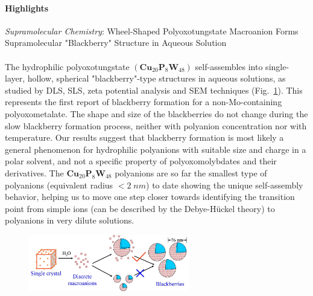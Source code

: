 \paragraph{Highlights}


{\sl Supramolecular Chemistry}: Wheel-Shaped Poly\-oxo\-tungstate
 Macro\-anion
Forms Supramolecular "Blackberry" Structure in Aqueous Solution\\
\\
The hydrophilic polyoxotungstate
$(\mathbf{Cu}_{20}\mathbf{P}_8\mathbf{W}_{48})$ self-assembles into single-layer, hollow,
spherical "blackberry"-type structures in aqueous solutions, as studied by DLS, SLS, zeta
potential analysis and SEM techniques (Fig.~\ref{kortzfig1}). This represents the first
report of blackberry formation for a non-Mo-containing polyoxometalate. The shape and size
of the blackberries do not change during the slow blackberry formation process, neither
with polyanion concentration nor with temperature. Our results suggest that blackberry
formation is most likely a general phenomenon for hydrophilic polyanions with suitable
size and charge in a polar solvent, and not a specific property of polyoxomolybdates and
their derivatives. The $\mathbf{Cu}_{20}\mathbf{P}_8\mathbf{W}_{48}$ polyanions are so far
the smallest type of polyanions (equivalent radius \mbox{$<2\;nm$}) to date showing the
unique self-assembly behavior, helping us to move one step closer towards identifying the
transition point from simple ions (can be described by the Debye-H\"{u}ckel theory) to
polyanions in very dilute solutions.



\begin{figure}[ht]
  \begin{center}
    \includegraphics[width=7cm]{Kortz/kortzfig1}
    \label{kortzfig1}
  \end{center}
\end{figure}

